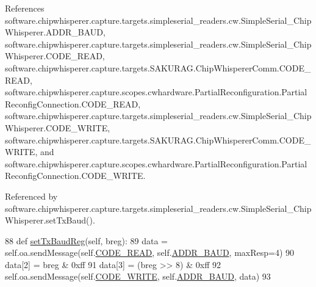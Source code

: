 References software.\+chipwhisperer.\+capture.\+targets.\+simpleserial\+\_\+readers.\+cw.\+Simple\+Serial\+\_\+\+Chip\+Whisperer.\+A\+D\+D\+R\+\_\+\+B\+A\+U\+D, software.\+chipwhisperer.\+capture.\+targets.\+simpleserial\+\_\+readers.\+cw.\+Simple\+Serial\+\_\+\+Chip\+Whisperer.\+C\+O\+D\+E\+\_\+\+R\+E\+A\+D, software.\+chipwhisperer.\+capture.\+targets.\+S\+A\+K\+U\+R\+A\+G.\+Chip\+Whisperer\+Comm.\+C\+O\+D\+E\+\_\+\+R\+E\+A\+D, software.\+chipwhisperer.\+capture.\+scopes.\+cwhardware.\+Partial\+Reconfiguration.\+Partial\+Reconfig\+Connection.\+C\+O\+D\+E\+\_\+\+R\+E\+A\+D, software.\+chipwhisperer.\+capture.\+targets.\+simpleserial\+\_\+readers.\+cw.\+Simple\+Serial\+\_\+\+Chip\+Whisperer.\+C\+O\+D\+E\+\_\+\+W\+R\+I\+T\+E, software.\+chipwhisperer.\+capture.\+targets.\+S\+A\+K\+U\+R\+A\+G.\+Chip\+Whisperer\+Comm.\+C\+O\+D\+E\+\_\+\+W\+R\+I\+T\+E, and software.\+chipwhisperer.\+capture.\+scopes.\+cwhardware.\+Partial\+Reconfiguration.\+Partial\+Reconfig\+Connection.\+C\+O\+D\+E\+\_\+\+W\+R\+I\+T\+E.



Referenced by software.\+chipwhisperer.\+capture.\+targets.\+simpleserial\+\_\+readers.\+cw.\+Simple\+Serial\+\_\+\+Chip\+Whisperer.\+set\+Tx\+Baud().


\begin{DoxyCode}
88     \textcolor{keyword}{def }\hyperlink{classsoftware_1_1chipwhisperer_1_1capture_1_1targets_1_1simpleserial__readers_1_1cw_1_1SimpleSerial__ChipWhisperer_acdedc9dbb22cab69832b04edb398b373}{setTxBaudReg}(self, breg):
89         data = self.oa.sendMessage(self.\hyperlink{classsoftware_1_1chipwhisperer_1_1capture_1_1targets_1_1simpleserial__readers_1_1cw_1_1SimpleSerial__ChipWhisperer_a4c5517e6c34f42b975c6d04e9622eed2}{CODE\_READ}, self.\hyperlink{classsoftware_1_1chipwhisperer_1_1capture_1_1targets_1_1simpleserial__readers_1_1cw_1_1SimpleSerial__ChipWhisperer_adbc80aae924a46ce425d4d3e5361fb96}{ADDR\_BAUD}, maxResp=4)
90         data[2] = breg & 0xff
91         data[3] = (breg >> 8) & 0xff
92         self.oa.sendMessage(self.\hyperlink{classsoftware_1_1chipwhisperer_1_1capture_1_1targets_1_1simpleserial__readers_1_1cw_1_1SimpleSerial__ChipWhisperer_a72fb88df1724ffc97de6509f2b4c5b41}{CODE\_WRITE}, self.\hyperlink{classsoftware_1_1chipwhisperer_1_1capture_1_1targets_1_1simpleserial__readers_1_1cw_1_1SimpleSerial__ChipWhisperer_adbc80aae924a46ce425d4d3e5361fb96}{ADDR\_BAUD}, data)
93 
\end{DoxyCode}
\hypertarget{classsoftware_1_1chipwhisperer_1_1capture_1_1targets_1_1simpleserial__readers_1_1cw_1_1SimpleSerial__ChipWhisperer_aaf6b49b9e065b296f906523c2febf075}{}
